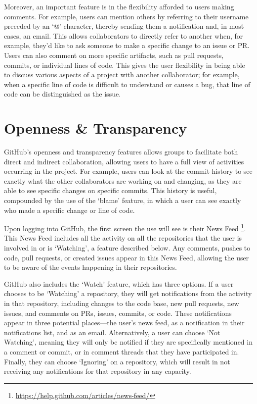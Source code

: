 Moreover, an important feature is in the flexibility afforded to users making comments. For example, users can mention others by referring to their username preceded by an `@' character, thereby sending them a notification and, in most cases, an email. This allows collaborators to directly refer to another when, for example, they'd like to ask someone to make a specific change to an issue or PR. Users can also comment on more specific artifacts, such as pull requests, commits, or individual lines of code. This gives the user flexibility in being able to discuss various aspects of a project with another collaborator; for example, when a specific line of code is difficult to understand or causes a bug, that line of code can be distinguished as the issue.

\section{Openness \& Transparency}
GitHub's openness and transparency features allows groups to facilitate both direct and indirect collaboration, allowing users to have a full view of activities occurring in the project. For example, users can look at the commit history to see exactly what the other collaborators are working on and changing, as they are able to see specific changes on specific commits. This history is useful, compounded by the use of the `blame' feature, in which a user can see exactly who made a specific change or line of code. %

Upon logging into GitHub, the first screen the use will see is their News Feed \footnote{\url{https://help.github.com/articles/news-feed/}}. This News Feed includes all the activity on all the repositories that the user is involved in or is `Watching', a feature described below. Any comments, pushes to code, pull requests, or created issues appear in this News Feed, allowing the user to be aware of the events happening in their repositories.

GitHub also includes the `Watch' feature, which has three options. If a user chooses to be `Watching' a repository, they will get notifications from the activity in that repository, including changes to the code base, new pull requests, new issues, and comments on PRs, issues, commits, or code. These notifications appear in three potential places---the user's news feed, as a notification in their notifications list, and as an email. Alternatively, a user can choose `Not Watching', meaning they will only be notified if they are specifically mentioned in a comment or commit, or in comment threads that they have participated in. Finally, they can choose `Ignoring' on a repository, which will result in not receiving any notifications for that repository in any capacity.

